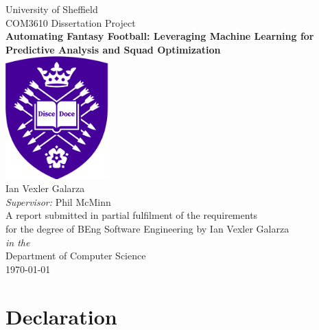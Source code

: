 \documentclass[11pt,oneside]{book}
\begin{document}

\frontmatter

\begin{titlepage}

\begin{center}
{\LARGE University of Sheffield}\\[1cm]
{\Large COM3610 Dissertation Project}\\
\linespread{1.2}\huge {\bfseries Automating Fantasy Football: Leveraging Machine Learning for Predictive Analysis and Squad Optimization}\\[1.5cm]
\linespread{1}
\includegraphics[width=4cm]{images/UOSLogo.png}\\[1cm]
{\Large Ian Vexler Galarza}\\[1cm]
{\large \emph{Supervisor:} Phil McMinn}\\[1cm] %
\large A report submitted in partial fulfilment of the requirements\\ for the degree of BEng Software Engineering by Ian Vexler Galarza\\[0.3cm] 
\textit{in the}\\[0.3cm]
Department of Computer Science\\[2cm]
\today
\end{center}

\end{titlepage}



\newpage
\section*{\Large Declaration}
\end{document}
